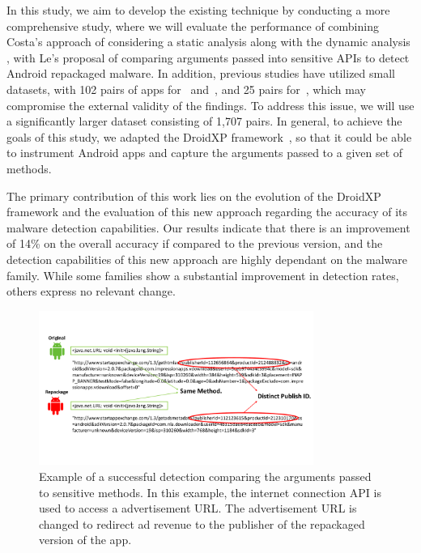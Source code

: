 In this study, we aim to develop the existing technique by conducting a more comprehensive study, where we will evaluate the performance of combining Costa's approach of considering a static analysis along with the dynamic analysis \cite{costa_exploring_2022}, with Le's proposal of comparing arguments passed into sensitive APIs \cite{le_towards_2018} to detect Android repackaged malware. In addition, previous studies have utilized small datasets, with 102 pairs of apps for~\cite{bao_mining_2018} and~\cite{costa_exploring_2022}, and 25 pairs for~\cite{le_towards_2018}, which may compromise the external validity of the findings. To address this issue, we will use a significantly larger dataset consisting of 1,707 pairs. In general, to achieve the goals of this study, we adapted the  DroidXP framework~\cite{costa_droidxp_2020}, so that it could be able to instrument Android apps and capture the arguments passed to a given set of methods.

The primary contribution of this work lies on the evolution of the DroidXP framework and the evaluation of this new approach regarding the accuracy of its malware detection capabilities. Our results indicate that there is an improvement of 14\% on the overall accuracy if compared to the previous version, and the detection capabilities of this new approach are highly dependant on the malware family. While some families show a substantial improvement in detection rates, others express no relevant change.

\begin{figure}
    \centering
    \includegraphics[width=0.8\textwidth]{img/parameterDiff.pdf}
    \caption{Example of a successful detection comparing the arguments passed to sensitive methods. In this example, the internet connection API is used to access a advertisement URL. The advertisement URL is changed to redirect ad revenue to the publisher of the repackaged version of the app.}
    \label{fig:successful-detection-example}
\end{figure}

